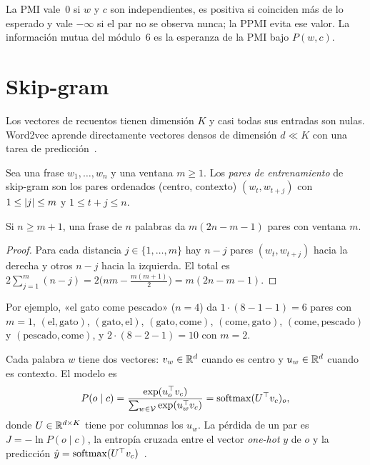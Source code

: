 La PMI vale~0 si $w$ y $c$ son independientes, es positiva si coinciden más de lo esperado y vale $-\infty$ si el par no se observa nunca; la PPMI evita ese valor. La información mutua del módulo~6 es la esperanza de la PMI bajo $P(w,c)$.

\section{Skip-gram}

Los vectores de recuentos tienen dimensión $K$ y casi todas sus entradas son nulas. Word2vec aprende directamente vectores densos de dimensión $d\ll K$ con una tarea de predicción~\cite{mikolov13a}.

\begin{definicion}
Sea una frase $w_1,\dots,w_n$ y una ventana $m\ge 1$. Los \emph{pares de entrenamiento} de skip-gram son los pares ordenados (centro, contexto) $(w_t,w_{t+j})$ con $1\le\lvert j\rvert\le m$ y $1\le t+j\le n$.
\end{definicion}

\begin{proposicion}\label{prop:pares}
Si $n\ge m+1$, una frase de $n$ palabras da $m(2n-m-1)$ pares con ventana $m$.
\end{proposicion}

\begin{proof}
Para cada distancia $j\in\{1,\dots,m\}$ hay $n-j$ pares $(w_t,w_{t+j})$ hacia la derecha y otros $n-j$ hacia la izquierda. El total es $2\sum_{j=1}^{m}(n-j)=2\bigl(nm-\tfrac{m(m+1)}{2}\bigr)=m(2n-m-1)$.
\end{proof}

Por ejemplo, «el gato come pescado» ($n=4$) da $1\cdot(8-1-1)=6$ pares con $m=1$, $(\text{el},\text{gato})$, $(\text{gato},\text{el})$, $(\text{gato},\text{come})$, $(\text{come},\text{gato})$, $(\text{come},\text{pescado})$ y $(\text{pescado},\text{come})$, y $2\cdot(8-2-1)=10$ con $m=2$.

\begin{definicion}\label{def:skipgram}
Cada palabra $w$ tiene dos vectores: $v_w\in\mathbb{R}^{d}$ cuando es centro y $u_w\in\mathbb{R}^{d}$ cuando es contexto. El modelo es
\[
P(o\mid c)=\frac{\exp(u_o^{\top}v_c)}{\sum_{w\in\mathcal{V}}\exp(u_w^{\top}v_c)}=\operatorname{softmax}(U^{\top}v_c)_o,
\]
donde $U\in\mathbb{R}^{d\times K}$ tiene por columnas los $u_w$. La pérdida de un par es $J=-\ln P(o\mid c)$, la entropía cruzada entre el vector \emph{one-hot} $y$ de $o$ y la predicción $\hat y=\operatorname{softmax}(U^{\top}v_c)$~\cite{cs224n}.
\end{definicion}

